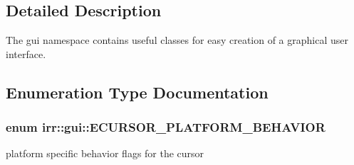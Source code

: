\subsection{Detailed Description}
The gui namespace contains useful classes for easy creation of a graphical user interface. 

\subsection{Enumeration Type Documentation}
\subsubsection[{\texorpdfstring{E\+C\+U\+R\+S\+O\+R\+\_\+\+P\+L\+A\+T\+F\+O\+R\+M\+\_\+\+B\+E\+H\+A\+V\+I\+OR}{ECURSOR\_PLATFORM\_BEHAVIOR}}]{\setlength{\rightskip}{0pt plus 5cm}enum {\bf irr\+::gui\+::\+E\+C\+U\+R\+S\+O\+R\+\_\+\+P\+L\+A\+T\+F\+O\+R\+M\+\_\+\+B\+E\+H\+A\+V\+I\+OR}}\hypertarget{namespaceirr_1_1gui_abbd186f9cfba2f805d98248df226acef}{}\label{namespaceirr_1_1gui_abbd186f9cfba2f805d98248df226acef}


platform specific behavior flags for the cursor 

